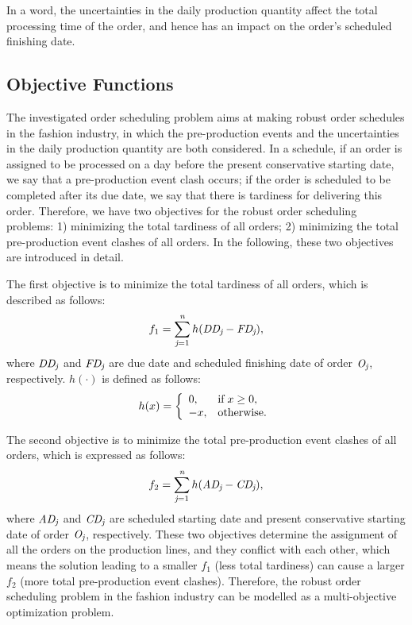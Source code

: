 \documentclass[journal]{IEEEtran}
\theoremstyle{definition}
\begin{document}
In a word, the uncertainties in the daily production quantity affect the total processing time of the order, and hence has an impact on the order's scheduled finishing date.

\subsection{Objective Functions}
The investigated order scheduling problem aims at making robust order schedules in the fashion industry, in which the pre-production events and the uncertainties in the daily production quantity are both considered. In a schedule, if an order is assigned to be processed on a day before the present conservative starting date, we say that a pre-production event clash occurs; if the order is scheduled to be completed after its due date, we say that there is tardiness for delivering this order.
Therefore, we have two objectives for the robust order scheduling problems: 1) minimizing the total tardiness of all orders; 2) minimizing the total pre-production event clashes of all orders. In the following, these two objectives are introduced in detail.

The first objective is to minimize the total tardiness of all orders, which is described as follows:
\begin{equation}
f_1=\sum\limits_{\emph{j}=1}^{\emph{n}}h(\emph{DD}_\emph{j}-\emph{FD}_\emph{j}),
\label{eqobj1}
\end{equation}
where $\emph{DD}_\emph{j}$ and $\emph{FD}_\emph{j}$ are due date and scheduled finishing date of order $\emph{O}_\emph{j}$, respectively. $h(\cdot)$ is defined as follows:
\begin{equation}
 h(x)=\left\{
\begin{array}{ll}
0, & \textrm{if} \hspace{0.1cm} x\geq0,\\
-x,       & \textrm{otherwise}.
\end{array} \right.
\label{eqh}
\end{equation}

The second objective is to minimize the total pre-production event clashes of all orders, which is expressed as follows:
\begin{equation}
f_2=\sum\limits_{\emph{j}=1}^{\emph{n}}h(\emph{AD}_\emph{j}-\emph{CD}_\emph{j}),
\label{eqobj2}
\end{equation}
where $\emph{AD}_\emph{j}$ and $\emph{CD}_\emph{j}$ are scheduled starting date and present conservative starting date of order $\emph{O}_\emph{j}$, respectively.
These two objectives determine the assignment of all the orders on the production lines, and they conflict with each other, which means the solution leading to a smaller $f_1$ (less total tardiness) can cause a larger $f_2$ (more total pre-production event clashes). Therefore, the robust order scheduling problem in the fashion industry can be modelled as a multi-objective optimization problem.
\end{document}
